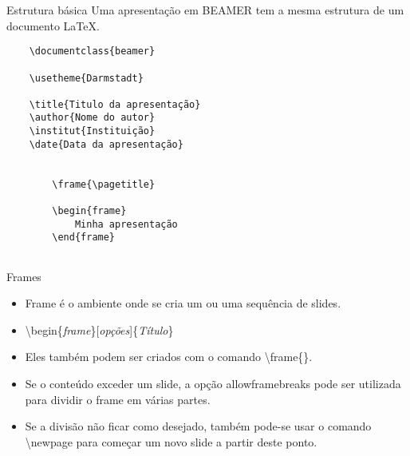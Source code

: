 \begin{frame}[fragile]{Estrutura básica}
    Uma apresentação em {\footnotesize BEAMER} tem a mesma estrutura de um documento \LaTeX.
    
{\footnotesize
\begin{verbatim}
    \documentclass{beamer}

    \usetheme{Darmstadt}

    \title{Titulo da apresentação}
    \author{Nome do autor}
    \institut{Instituição}
    \date{Data da apresentação}

    
        \frame{\pagetitle}

        \begin{frame}
            Minha apresentação
        \end{frame}
    
\end{verbatim}
}
\end{frame}

\begin{frame}[fragile]{Frames}
    \begin{itemize}
    \item Frame é o ambiente onde se cria um ou uma sequência de slides.
    \item[] \alert{\textbackslash begin\{\textit{frame}\}[\textit{opções}]\{\textit{Título}\}}
    \item Eles também podem ser criados com o comando \alert{\textbackslash frame\{\}}.
    \item Se o conteúdo exceder um slide, a opção \alert{allowframebreaks} pode ser utilizada para dividir o frame em várias partes.
    \item Se a divisão não ficar como desejado, também pode-se usar o comando \alert{\textbackslash newpage} para começar um novo slide a partir deste ponto.
    \end{itemize}
\end{frame}

